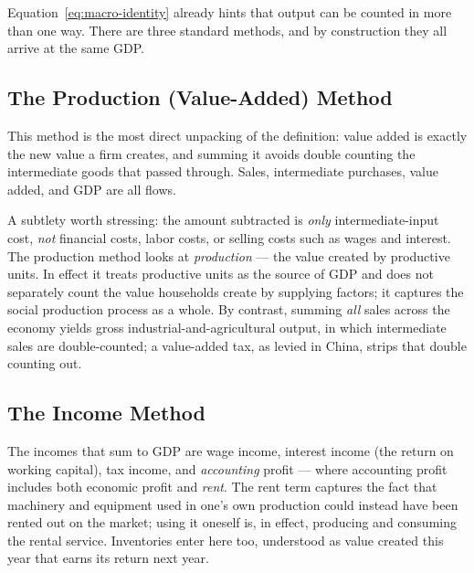 Equation~\eqref{eq:macro-identity} already hints that output can be counted in more than one way. There are three standard methods, and by construction they all arrive at the same GDP.

\subsection{The Production (Value-Added) Method}


This method is the most direct unpacking of the definition: value added is exactly the new value a firm creates, and summing it avoids double counting the intermediate goods that passed through. Sales, intermediate purchases, value added, and GDP are all flows.

A subtlety worth stressing: the amount subtracted is \emph{only} intermediate-input cost, \emph{not} financial costs, labor costs, or selling costs such as wages and interest. The production method looks at \emph{production} --- the value created by productive units. In effect it treats productive units as the source of GDP and does not separately count the value households create by supplying factors; it captures the social production process as a whole. By contrast, summing \emph{all} sales across the economy yields gross industrial-and-agricultural output, in which intermediate sales are double-counted; a value-added tax, as levied in China, strips that double counting out.

\subsection{The Income Method}


The incomes that sum to GDP are wage income, interest income (the return on working capital), tax income, and \emph{accounting} profit --- where accounting profit includes both economic profit and \emph{rent}. The rent term captures the fact that machinery and equipment used in one's own production could instead have been rented out on the market; using it oneself is, in effect, producing and consuming the rental service. Inventories enter here too, understood as value created this year that earns its return next year.

